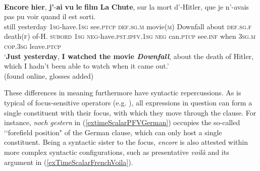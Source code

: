 \begin{exe}
	
	\ex {} \label{extimeScalarPFVFrench}\\
	\gll \textbf{Encore} \textbf{hier}, \textbf{j'}-\textbf{ai} \textbf{vu} \textbf{le} \textbf{film} {\textbf{La} \textbf{Chute}}, sur la mort d’-Hitler, que je n’-avais pas pu voir quand il est sorti.\\
	still yesterday 1\textsc{sg}-have.1\textsc{sg} see.\textsc{ptcp} \textsc{def}.\textsc{sg}.\textsc{m} movie(\textsc{m}) Downfall about \textsc{def}.\textsc{sg}.\textsc{f} death(\textsc{f}) of-H. \textsc{subord} 1\textsc{sg} \textsc{neg}-have.\textsc{pst}.\textsc{ipfv}.1\textsc{sg} \textsc{neg} can.\textsc{ptcp} see.\textsc{inf} when 3\textsc{sg}.\textsc{m} \textsc{cop}.3\textsc{sg} leave.\textsc{ptcp}\\
	\glt \lq \textbf{Just yesterday}, \textbf{I watched the movie \textit{Downfall}}, about the death of Hitler, which I hadn't been able to watch when it came out.'
	\\(found online, glosses added)%
\end{exe}	

These differences in meaning furthermore have syntactic repercussions. As is typical of focus-sensitive operators (e.g. \cite[ch. 2]{Koenig1991}), all expressions in question can form a single constituent with their focus, with which they move through the clause. For instance, \textit{noch gestern} in (\ref{extimeScalarPFVGerman}) occupies the so-called \lq\lq forefield position" of the German clause, which can only host a single constituent. Being a syntactic sister to the focus,  \textit{encore} is also attested within more complex syntactic configurations, such as presentative \textit{voilà} and its argument in (\ref{exTimeScalarFrenchVoila}).

